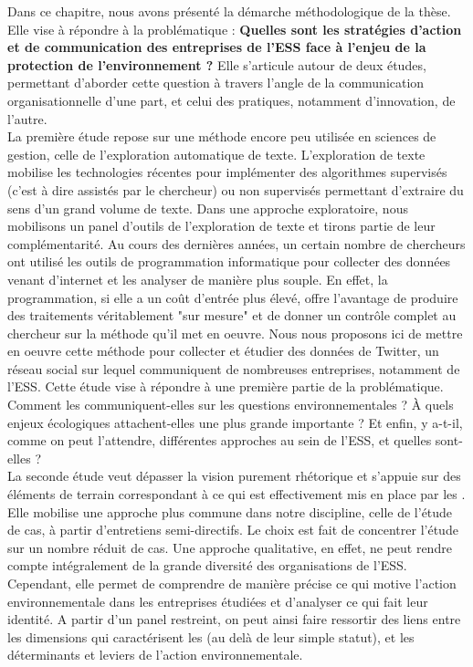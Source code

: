 Dans ce chapitre, nous avons présenté la démarche méthodologique de la thèse. Elle vise à répondre à la problématique : \textbf{Quelles sont les stratégies d’action et de communication des entreprises de l’ESS face à l'enjeu de la protection de l'environnement ?} Elle s'articule autour de deux études, permettant d'aborder cette question à travers l'angle de la communication organisationnelle d'une part, et celui des pratiques, notamment d'innovation, de l'autre. \\

La première étude repose sur une méthode encore peu utilisée en sciences de gestion, celle de l'exploration automatique de texte. L'exploration de texte mobilise les technologies récentes pour implémenter des algorithmes supervisés (c'est à dire assistés par le chercheur) ou non supervisés permettant d'extraire du sens d'un grand volume de texte. Dans une approche exploratoire, nous mobilisons un panel d'outils de l'exploration de texte et tirons partie de leur complémentarité.
Au cours des dernières années, un certain nombre de chercheurs ont utilisé les outils de programmation informatique pour collecter des données venant d'internet et les analyser de manière plus souple. En effet, la programmation, si elle a un coût d'entrée plus élevé, offre l'avantage de produire des traitements véritablement "sur mesure" et de donner un contrôle complet au chercheur sur la méthode qu'il met en oeuvre. Nous nous proposons ici de mettre en oeuvre cette méthode pour collecter et étudier des données de Twitter, un réseau social sur lequel communiquent de nombreuses entreprises, notamment de l'ESS. Cette étude vise à répondre à une première partie de la problématique. Comment les \eess communiquent-elles sur les questions environnementales ? À quels enjeux écologiques attachent-elles une plus grande importante ? Et enfin, y a-t-il, comme on peut l'attendre, différentes approches au sein de l'ESS, et quelles sont-elles ? \\

La seconde étude veut dépasser la vision purement rhétorique et s'appuie sur des éléments de terrain correspondant à ce qui est effectivement mis en place par les \eess. Elle mobilise une approche plus commune dans notre discipline, celle de l'étude de cas, à partir d'entretiens semi-directifs. Le choix est fait de concentrer l'étude sur un nombre réduit de cas. Une approche qualitative, en effet, ne peut rendre compte intégralement de la grande diversité des organisations de l'ESS. Cependant, elle permet de comprendre de manière précise ce qui motive l'action environnementale dans les entreprises étudiées et d'analyser ce qui fait leur identité. A partir d'un panel restreint, on peut ainsi faire ressortir des liens entre les dimensions qui caractérisent les \eess (au delà de leur simple statut), et les déterminants et leviers de l'action environnementale. \\

